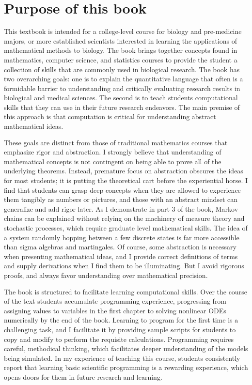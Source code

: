 \documentclass[
  letterpaper,
  DIV=11,
  numbers=noendperiod]{scrreprt}
\begin{document}
\hypertarget{purpose-of-this-book}{%
\section*{Purpose of this book}\label{purpose-of-this-book}}


This textbook is intended for a college-level course for biology and
pre-medicine majors, or more established scientists interested in
learning the applications of mathematical methods to biology. The book
brings together concepts found in mathematics, computer science, and
statistics courses to provide the student a collection of skills that
are commonly used in biological research. The book has two overarching
goals: one is to explain the quantitative language that often is a
formidable barrier to understanding and critically evaluating research
results in biological and medical sciences. The second is to teach
students computational skills that they can use in their future research
endeavors. The main premise of this approach is that computation is
critical for understanding abstract mathematical ideas.

These goals are distinct from those of traditional mathematics courses
that emphasize rigor and abstraction. I strongly believe that
understanding of mathematical concepts is not contingent on being able
to prove all of the underlying theorems. Instead, premature focus on
abstraction obscures the ideas for most students; it is putting the
theoretical cart before the experiential horse. I find that students can
grasp deep concepts when they are allowed to experience them tangibly as
numbers or pictures, and those with an abstract mindset can generalize
and add rigor later. As I demonstrate in part 3 of the book, Markov
chains can be explained without relying on the machinery of measure
theory and stochastic processes, which require graduate level
mathematical skills. The idea of a system randomly hopping between a few
discrete states is far more accessible than sigma algebras and
martingales. Of course, some abstraction is necessary when presenting
mathematical ideas, and I provide correct definitions of terms and
supply derivations when I find them to be illuminating. But I avoid
rigorous proofs, and always favor understanding over mathematical
precision.

The book is structured to facilitate learning computational skills. Over
the course of the text students accumulate programming experience,
progressing from assigning values to variables in the first chapter to
solving nonlinear ODEs numerically by the end of the book. Learning to
program for the first time is a challenging task, and I facilitate it by
providing sample scripts for students to copy and modify to perform the
requisite calculations. Programming requires careful, methodical
thinking, which facilitates deeper understanding of the models being
simulated. In my experience of teaching this course, students
consistently report that learning basic scientific programming is a
rewarding experience, which opens doors for them in future research and
learning.
\end{document}

